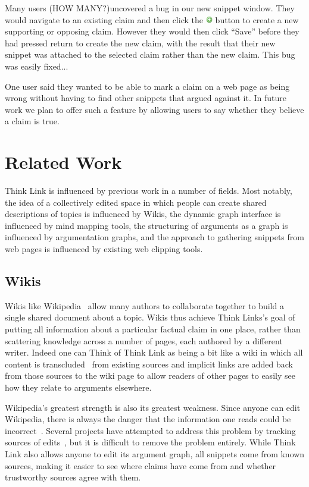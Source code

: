 \documentclass{chi2009}
\newcommand{\todo}[1]{}
\newcommand{\howmany}{{\color{red} (HOW MANY?)}}
\begin{document}
Many users \howmany uncovered a bug in our new snippet window. They would navigate to an existing claim and then click the \includegraphics[width=0.3cm]{../images/add.png} button to create a new supporting or opposing claim. However they would then click ``Save'' before they had pressed return to create the new claim, with the result that their new snippet was attached to the selected claim rather than the new claim. This bug was easily fixed...

One user said they wanted to be able to mark a claim on a web page as being wrong without having to find other snippets that argued against it. In future work we plan to offer such a feature by allowing users to say whether they believe a claim is true.

\todo{quote collection}

\section{Related Work}

Think Link is influenced by previous work in a number of fields. Most notably, the idea of a collectively edited space in which people can create shared descriptions of topics is influenced by Wikis, the dynamic graph interface is influenced by mind mapping tools, the structuring of arguments as a graph is influenced by argumentation graphs, and the approach to gathering snippets from web pages is influenced by existing web clipping tools.

\subsection{Wikis}

Wikis like Wikipedia~\cite{wikipedia} allow many authors to collaborate together to build a single shared document about a topic. Wikis thus achieve Think Links's goal of putting all information about a particular factual claim in one place, rather than scattering knowledge across a number of pages, each authored by a different writer. Indeed one can Think of Think Link as being a bit like a wiki in which all content is transcluded~\cite{transclusion} from existing sources and implicit links are added back from those sources to the wiki page to allow readers of other pages to easily see how they relate to arguments elsewhere.

Wikipedia's greatest strength is also its greatest weakness. Since anyone can edit Wikipedia, there is always the danger that the information one reads could be incorrect~\cite{wikifalse}. Several projects have attempted to address this problem by tracking sources of edits~\cite{wikicorrect}, but it is difficult to remove the problem entirely. While Think Link also allows anyone to edit its argument graph, all snippets come from known sources, making it easier to see where claims have come from and whether trustworthy sources agree with them.
\end{document}
